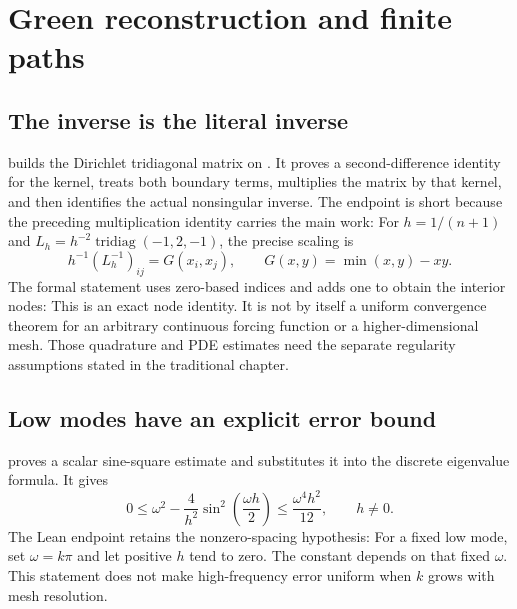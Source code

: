 \clearpage\section{Green reconstruction and finite paths}
\label{sec:green}
\subsection{The inverse is the literal inverse}
 builds the Dirichlet tridiagonal matrix on . It proves a second-difference identity for the kernel, treats both boundary terms, multiplies the matrix by that kernel, and then identifies the actual nonsingular inverse. The endpoint is short because the preceding multiplication identity carries the main work:
For $h=1/(n+1)$ and $L_h=h^{-2}\operatorname{tridiag}(-1,2,-1)$, the precise scaling is
\[
h^{-1}(L_h^{-1})_{ij}=G(x_i,x_j),\qquad G(x,y)=\min(x,y)-xy.
\]
The formal statement uses zero-based  indices and adds one to obtain the interior nodes:
This is an exact node identity. It is not by itself a uniform convergence theorem for an arbitrary continuous forcing function or a higher-dimensional mesh. Those quadrature and PDE estimates need the separate regularity assumptions stated in the traditional chapter.

\subsection{Low modes have an explicit error bound}
 proves a scalar sine-square estimate and substitutes it into the discrete eigenvalue formula. It gives
\[
0\le \omega^2-\frac{4}{h^2}\sin^2\!\left(\frac{\omega h}{2}\right)
\le\frac{\omega^4h^2}{12},\qquad h\ne0.
\]
The Lean endpoint retains the nonzero-spacing hypothesis:
For a fixed low mode, set $\omega=k\pi$ and let positive $h$ tend to zero. The constant depends on that fixed $\omega$. This statement does not make high-frequency error uniform when $k$ grows with mesh resolution.

